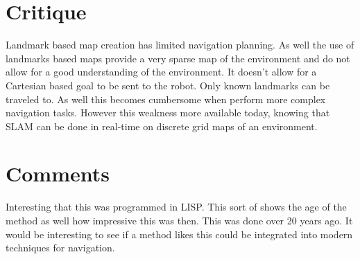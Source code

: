 \documentclass{article}
\begin{document}
\section*{Critique}
Landmark based map creation has limited navigation planning. As well the use of landmarks based maps provide a very sparse map of the environment and do not allow for a good understanding of the environment. It doesn't allow for a Cartesian based goal to be sent to the robot. Only known landmarks can be traveled to. As well this becomes cumbersome when perform more complex navigation tasks. However this weakness more available today, knowing that SLAM can be done in real-time on discrete grid maps of an environment.
\section*{Comments}
Interesting that this was programmed in LISP. This sort of shows the age of the method as well how impressive this was then. This was done over 20 years ago. It would be interesting to see if a method likes this could be integrated into modern techniques for navigation.
\cite{143349}
\end{document}
